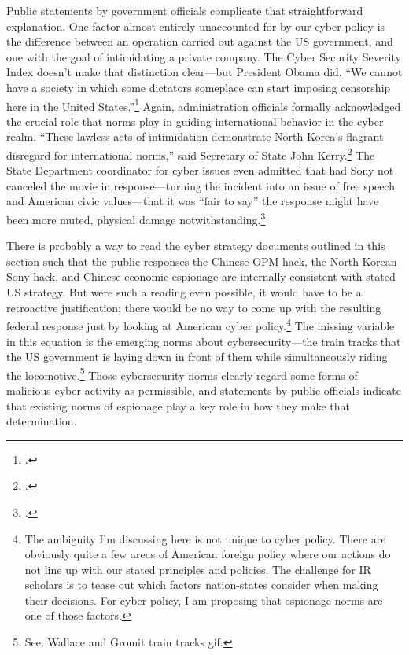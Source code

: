 \documentclass{memoir}
\begin{document}
\begin{refsegment}
Public statements by government officials complicate that straightforward explanation. One factor almost entirely unaccounted for by our cyber policy is the difference between an operation carried out against the US government, and one with the goal of intimidating a private company. The Cyber Security Severity Index doesn't make that distinction clear---but President Obama did. ``We cannot have a society in which some dictators someplace can start imposing censorship here in the United States.''\footcite{perez_obama_2014} Again, administration officials formally acknowledged the crucial role that norms play in guiding international behavior in the cyber realm. ``These lawless acts of intimidation demonstrate North Korea's flagrant disregard for international norms,'' said Secretary of State John Kerry.\footcite{perez_obama_2014} The State Department coordinator for cyber issues even admitted that had Sony not canceled the movie in response---turning the incident into an issue of free speech and American civic values---that it was ``fair to say'' the response might have been more muted, physical damage notwithstanding.\footcite{nakashima_why_2015}

There is probably a way to read the cyber strategy documents outlined in this section such that the public responses the Chinese OPM hack, the North Korean Sony hack, and Chinese economic espionage are internally consistent with stated US strategy. But were such a reading even possible, it would have to be a retroactive justification; there would be no way to come up with the resulting federal response just by looking at American cyber policy.\footnote{The ambiguity I'm discussing here is not unique to cyber policy. There are obviously quite a few areas of American foreign policy where our actions do not line up with our stated principles and policies. The challenge for IR scholars is to tease out which factors nation-states consider when making their decisions. For cyber policy, I am proposing that espionage norms are one of those factors.} The missing variable in this equation is the emerging norms about cybersecurity---the train tracks that the US government is laying down in front of them while simultaneously riding the locomotive.\footnote{See: Wallace and Gromit train tracks gif.} Those cybersecurity norms clearly regard some forms of malicious cyber activity as permissible, and statements by public officials indicate that existing norms of espionage play a key role in how they make that determination.


\end{refsegment}
\end{document}
